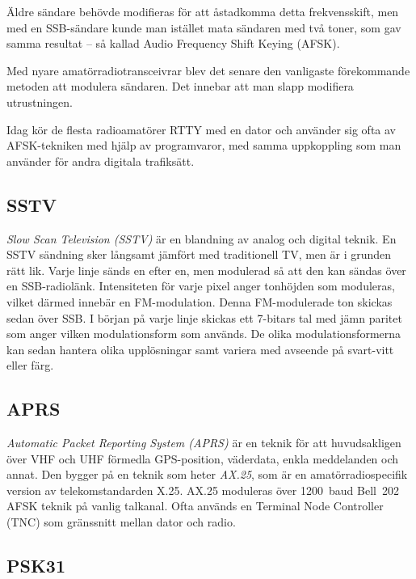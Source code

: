 Äldre sändare behövde modifieras för att åstadkomma detta frekvensskift, men
med en SSB-sändare kunde man istället mata sändaren med två toner, som gav
samma resultat -- så kallad Audio Frequency Shift Keying (AFSK).

Med nyare amatörradiotransceivrar blev det senare den vanligaste förekommande
metoden att modulera sändaren.
Det innebar att man slapp modifiera utrustningen.

Idag kör de flesta radioamatörer RTTY med en dator och använder sig ofta av
AFSK-tekniken med hjälp av programvaror, med samma uppkoppling som man använder
för andra digitala trafiksätt.

\subsection{SSTV}

\emph{Slow Scan Television (SSTV)} är en blandning av analog och digital teknik.
En SSTV sändning sker långsamt jämfört med traditionell TV, men är i grunden
rätt lik.
Varje linje sänds en efter en, men modulerad så att den kan sändas över en
SSB-radiolänk.
Intensiteten för varje pixel anger tonhöjden som moduleras, vilket därmed
innebär en FM-modulation.
Denna FM-modulerade ton skickas sedan över SSB.
I början på varje linje skickas ett 7-bitars tal med jämn paritet som anger
vilken modulationsform som används.
De olika modulationsformerna kan sedan hantera olika upplösningar samt variera
med avseende på svart-vitt eller färg.

\subsection{APRS}
\label{modulation_aprs}

\emph{Automatic Packet Reporting System (APRS)} är en teknik för att
huvudsakligen över VHF och UHF förmedla GPS-position, väderdata, enkla
meddelanden och annat.
Den bygger på en teknik som heter \emph{AX.25}, som är en amatörradiospecifik
version av telekomstandarden X.25.
AX.25 moduleras över 1200~baud Bell~202 AFSK teknik på vanlig talkanal.
Ofta används en Terminal Node Controller (TNC) som gränssnitt mellan dator och
radio.

\subsection{PSK31}
\label{modulation_psk31}

